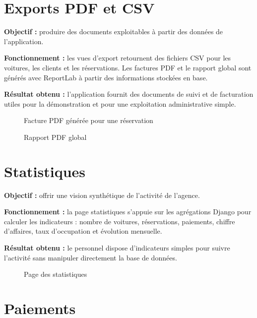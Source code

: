 \section{Exports PDF et CSV}

\textbf{Objectif :} produire des documents exploitables à partir des données de l'application.

\textbf{Fonctionnement :} les vues d'export retournent des fichiers CSV pour les voitures, les clients et les réservations. Les factures PDF et le rapport global sont générés avec ReportLab à partir des informations stockées en base.

\textbf{Résultat obtenu :} l'application fournit des documents de suivi et de facturation utiles pour la démonstration et pour une exploitation administrative simple.

\begin{figure}[H]
\centering
{}
\caption{Facture PDF générée pour une réservation}
\end{figure}

\begin{figure}[H]
\centering
{}
\caption{Rapport PDF global}
\end{figure}

\section{Statistiques}

\textbf{Objectif :} offrir une vision synthétique de l'activité de l'agence.

\textbf{Fonctionnement :} la page statistiques s'appuie sur les agrégations Django pour calculer les indicateurs : nombre de voitures, réservations, paiements, chiffre d'affaires, taux d'occupation et évolution mensuelle.

\textbf{Résultat obtenu :} le personnel dispose d'indicateurs simples pour suivre l'activité sans manipuler directement la base de données.

\begin{figure}[H]
\centering
{}
\caption{Page des statistiques}
\end{figure}

\section{Paiements}

